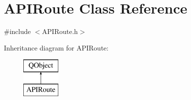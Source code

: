 \hypertarget{class_a_p_i_route}{}\section{A\+P\+I\+Route Class Reference}
\label{class_a_p_i_route}


{\ttfamily \#include $<$A\+P\+I\+Route.\+h$>$}

Inheritance diagram for A\+P\+I\+Route\+:\begin{figure}[H]
\begin{center}
\leavevmode
\includegraphics[height=2.000000cm]{class_a_p_i_route}
\end{center}
\end{figure}
